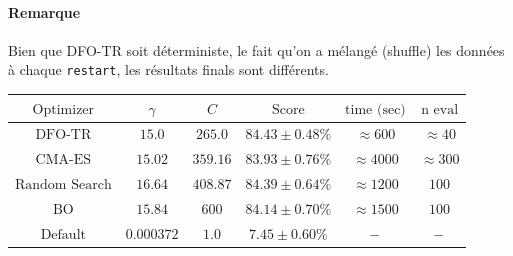 \documentclass[12 pt, a4paper]{article}
\begin{document}
\paragraph*{Remarque} Bien que DFO-TR soit déterministe, le fait qu'on a mélangé (shuffle) les données à chaque \texttt{restart}, les résultats finals sont différents.

\begin{center}
\begin{tabular}{|c|c|c|c|c|c|}
  \hline
  $\text{Optimizer}$ & $\gamma$ & $C$ & $\text{Score}$ & $\text{time (sec)}$ & $\text{n eval}$ \\
  \hline
  $\text{DFO-TR}$ & $15.0$ & $265.0$ & $84.43 \pm 0.48 \%$ & $\approx 600$ & $\approx 40$ \\
  $\text{CMA-ES}$ & $15.02$ & $359.16$ & $83.93 \pm 0.76 \%$ & $\approx 4000$ & $\approx 300$\\
  $\text{Random Search}$ & $16.64$ & $408.87$ & $84.39 \pm 0.64 \%$ & $\approx 1200$ & $100$\\
  $\text{BO}$ & $15.84$ & $600$ & $84.14 \pm 0.70 \%$ & $\approx 1500$ & $100$\\
  $\text{Default}$ & $0.000372$ & $1.0$ & $7.45 \pm 0.60 \%$ & $\--$ & $\--$\\
  \hline
\end{tabular}
\end{center}
\end{document}
